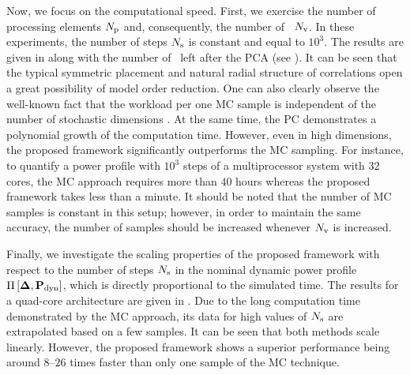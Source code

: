 
Now, we focus on the computational speed. First, we exercise the number of processing elements ${N_\text{p}}$ and, consequently, the number of \rvs\ ${N_\text{v}}$. In these experiments, the number of steps $N_\text{s}$ is constant and equal to $10^3$. The results are given in  along with the number of \rvs\ left after the PCA (see ). It can be seen that the typical symmetric placement and natural radial structure of correlations \cite{cheng2011} open a great possibility of model order reduction. One can also clearly observe the well-known fact that the workload per one MC sample is independent of the number of stochastic dimensions \cite{maitre2010}. At the same time, the PC demonstrates a polynomial growth \cite{heiss2008} of the computation time. However, even in high dimensions, the proposed framework significantly outperforms the MC sampling. For instance, to quantify a power profile with $10^3$ steps of a multiprocessor system with $32$ cores, the MC approach requires more than $40$ hours whereas the proposed framework takes less than a minute. It should be noted that the number of MC samples is constant in this setup; however, in order to maintain the same accuracy, the number of samples should be increased whenever ${N_\text{v}}$ is increased.

Finally, we investigate the scaling properties of the proposed framework with respect to the number of steps $N_\text{s}$ in the nominal dynamic power profile $\prof{\mP_\dyn}$, which is directly proportional to the simulated time. The results for a quad-core architecture are given in . Due to the long computation time demonstrated by the MC approach, its data for high values of $N_\text{s}$ are extrapolated based on a few samples. It can be seen that both methods scale linearly. However, the proposed framework shows a superior performance being around $8$--$26$ times faster than only one sample of the MC technique.
